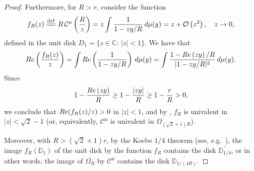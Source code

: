 \documentclass[reqno,11pt]{amsart}
\theoremstyle{plain}
\theoremstyle{definition}
\theoremstyle{remark}
\numberwithin{equation}{section}
\numberwithin{equation}{section}
\renewcommand{\Re}{\mathop{\rm Re}}
\newcommand{\C}{\mathbb{C}}
\newcommand{\D}{\mathbb{D}}
\newcommand{\isdef}{\overset{\mathrm{def}}{=\joinrel=}}
\begin{document}
\begin{proof}
Furthermore, for $R>r$, consider the function
\begin{equation}
    \label{defF1}
    f_R (z) \isdef R\, \mathcal C^\mu\left(\frac{R}{z}\right)= z \int \frac{1}{1-z y/R} \, d\mu(y)= z+ \mathcal O\left( z^2 \right), \quad z\to 0,
\end{equation}
defined in the unit disk $D_1=\{z\in \C:\, |z|<1\}$. 
We have that
$$
\Re \left( \frac{f_R(z)}{z} \right) = \int \Re \left( \frac{1}{1-z y/R}\right) \, d\mu(y) = \int   \frac{  1-\Re \left( z y\right)/R}{|1-z y/R|^2}  \, d\mu(y) .
$$
Since
$$
 1-\frac{\Re \left( z y\right)}{R}\ge 1-\frac{  \left| z y\right|}{R}\ge 1-\frac{  r}{R}>0,
$$
we conclude that $\Re(f_R(z)/z)>0$ in $|z|<1$, and by \cite[Theorem 3]{MR0140674}, $f_R$ is univalent in $|z|<\sqrt{2}-1$ (or, equivalently, $\mathcal C^\mu$ is univalent in $\Omega_{(\sqrt{2}+1)R}$).

Moreover, with $R>(\sqrt{2}+1)r$, by the Koebe $1/4$ theorem (see, e.g.~\cite[\S 2.2]{MR0708494}), the image $f_R(\D_1)$ of the unit disk by the function $f_R$ contains the disk $\overline{\D_{1/4}}$, or in other words, the image of $\overline{\Omega_R}$ by $\mathcal C^\mu$ contains the disk $\overline{\D_{1/(4R)}}$.
\end{proof}
\end{document}

